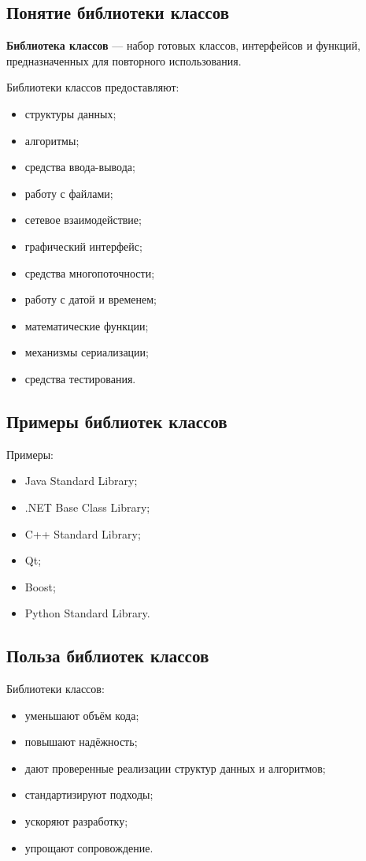 \documentclass[12pt,a4paper]{article}
\begin{document}
\subsection{Понятие библиотеки классов}

\textbf{Библиотека классов} --- набор готовых классов, интерфейсов и функций, предназначенных для повторного использования.

Библиотеки классов предоставляют:
\begin{itemize}
    \item структуры данных;
    \item алгоритмы;
    \item средства ввода-вывода;
    \item работу с файлами;
    \item сетевое взаимодействие;
    \item графический интерфейс;
    \item средства многопоточности;
    \item работу с датой и временем;
    \item математические функции;
    \item механизмы сериализации;
    \item средства тестирования.
\end{itemize}

\subsection{Примеры библиотек классов}

Примеры:
\begin{itemize}
    \item Java Standard Library;
    \item .NET Base Class Library;
    \item C++ Standard Library;
    \item Qt;
    \item Boost;
    \item Python Standard Library.
\end{itemize}

\subsection{Польза библиотек классов}

Библиотеки классов:
\begin{itemize}
    \item уменьшают объём кода;
    \item повышают надёжность;
    \item дают проверенные реализации структур данных и алгоритмов;
    \item стандартизируют подходы;
    \item ускоряют разработку;
    \item упрощают сопровождение.
\end{itemize}
\end{document}
